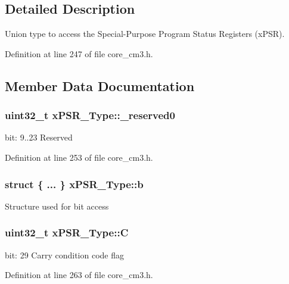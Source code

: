 \subsection{Detailed Description}
Union type to access the Special-\/\+Purpose Program Status Registers (x\+P\+SR). 

Definition at line 247 of file core\+\_\+cm3.\+h.



\subsection{Member Data Documentation}
\subsubsection[{\texorpdfstring{\+\_\+reserved0}{_reserved0}}]{\setlength{\rightskip}{0pt plus 5cm}uint32\+\_\+t x\+P\+S\+R\+\_\+\+Type\+::\+\_\+reserved0}\hypertarget{unionxPSR__Type_af438e0f407357e914a70b5bd4d6a97c5}{}\label{unionxPSR__Type_af438e0f407357e914a70b5bd4d6a97c5}
bit\+: 9..23 Reserved 

Definition at line 253 of file core\+\_\+cm3.\+h.

\subsubsection[{\texorpdfstring{b}{b}}]{\setlength{\rightskip}{0pt plus 5cm}struct \{ ... \}   x\+P\+S\+R\+\_\+\+Type\+::b}\hypertarget{unionxPSR__Type_a3b1063bb5cdad67e037cba993b693b70}{}\label{unionxPSR__Type_a3b1063bb5cdad67e037cba993b693b70}
Structure used for bit access 
\subsubsection[{\texorpdfstring{C}{C}}]{\setlength{\rightskip}{0pt plus 5cm}uint32\+\_\+t x\+P\+S\+R\+\_\+\+Type\+::C}\hypertarget{unionxPSR__Type_a40213a6b5620410cac83b0d89564609d}{}\label{unionxPSR__Type_a40213a6b5620410cac83b0d89564609d}
bit\+: 29 Carry condition code flag 

Definition at line 263 of file core\+\_\+cm3.\+h.

